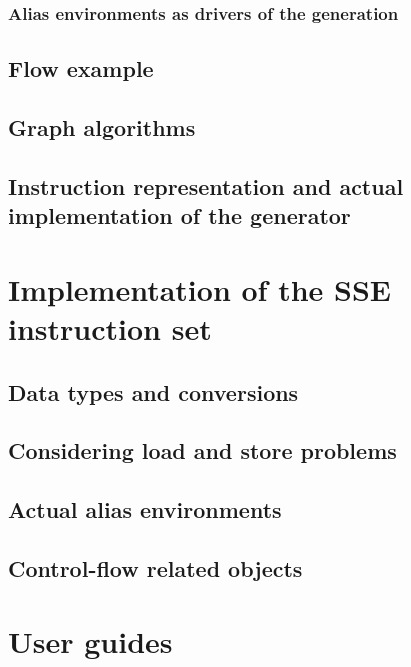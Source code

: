         \subsection{Alias environments as drivers of the generation}

    \section{Flow example}

    \section{Graph algorithms}

    \section{Instruction representation and actual implementation of the generator}


\chapter{Implementation of the SSE instruction set}

    \section{Data types and conversions}

    \section{Considering load and store problems} 

    \section{Actual alias environments} 
      

    \section{Control-flow related objects} 


\chapter{User guides}

